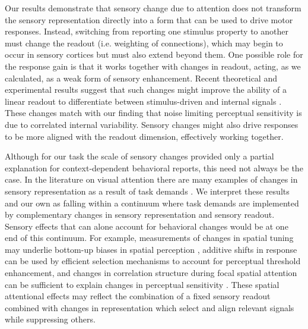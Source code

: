 Our results demonstrate that sensory change due to attention does not transform the sensory representation directly into a form that can be used to drive motor responses. Instead, switching from reporting one stimulus property to another must change the readout (i.e. weighting of connections), which may begin to occur in sensory cortices \citep{Ruff2017-kl} but must also extend beyond them. One possible role for the response gain is that it works together with changes in readout, acting, as we calculated, as a weak form of sensory enhancement. Recent theoretical and experimental results suggest that such changes might improve the ability of a linear readout to differentiate between stimulus-driven and internal signals \citep{Ecker2016-ro,Rabinowitz2015-uz,Snyder2018-yr}. These changes match with our finding that noise limiting perceptual sensitivity is due to correlated internal variability. Sensory changes might also drive responses to be more aligned with the readout dimension, effectively working together.  

Although for our task the scale of sensory changes provided only a partial explanation for context-dependent behavioral reports, this need not always be the case. In the literature on visual attention there are many examples of changes in sensory representation as a result of task demands \citep{Carrasco2011-xp}. We interpret these results and our own as falling within a continuum where task demands are implemented by complementary changes in sensory representation and sensory readout. Sensory effects that can alone account for behavioral changes would be at one end of this continuum. For example, measurements of changes in spatial tuning \citep{Kay2015-pd,Klein2014-oe,Vo2017-oi} may underlie bottom-up biases in spatial perception \citep{Klein2016-ox}, additive shifts in response \citep{Buracas2007-pe,Li2008-fe,Murray2008-xj} can be used by efficient selection mechanisms \citep{Chen2012-fu,Hara2014-mv,Pestilli2011-gi} to account for perceptual threshold enhancement, and changes in correlation structure during focal spatial attention \citep{Mitchell2009-do} can be sufficient to explain changes in perceptual sensitivity \citep{Cohen2010-xs,Cohen2009-bt}. These spatial attentional effects may reflect the combination of a fixed sensory readout combined with changes in representation which select \citep{Carrasco2011-xp} and align \citep{Ruff2018-yx} relevant signals while suppressing others.


